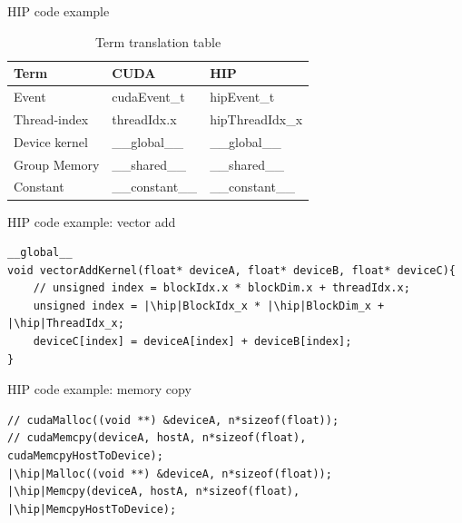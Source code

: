 \documentclass[aspectratio=169]{beamer}
\newcommand{\hip}{\textbf{\color{red}{hip}}}
\begin{document}
\begin{frame}{HIP code example}

\begin{table}[]
    \centering
    \begin{tabular}{l|l|l}
Term & CUDA & HIP\\\hline
Event & cudaEvent\_t & hipEvent\_t\\
Thread-index & threadIdx.x & hipThreadIdx\_x\\
Device kernel & \_\_global\_\_ & \_\_global\_\_\\
Group Memory &  \_\_shared\_\_ & \_\_shared\_\_\\
Constant & \_\_constant\_\_ & \_\_constant\_\_\\
\end{tabular}
    \caption{Term translation table}
    \label{tab:term_translate}
\end{table}

\end{frame}

\begin{frame}[fragile]{HIP code example: vector add}
\begin{verbatim}
__global__
void vectorAddKernel(float* deviceA, float* deviceB, float* deviceC){
    // unsigned index = blockIdx.x * blockDim.x + threadIdx.x;
    unsigned index = |\hip|BlockIdx_x * |\hip|BlockDim_x + |\hip|ThreadIdx_x;
    deviceC[index] = deviceA[index] + deviceB[index];
}
\end{verbatim}
\end{frame}

\begin{frame}[fragile]{HIP code example: memory copy}


\begin{verbatim}
// cudaMalloc((void **) &deviceA, n*sizeof(float));
// cudaMemcpy(deviceA, hostA, n*sizeof(float), cudaMemcpyHostToDevice);
|\hip|Malloc((void **) &deviceA, n*sizeof(float));
|\hip|Memcpy(deviceA, hostA, n*sizeof(float), |\hip|MemcpyHostToDevice);
\end{verbatim}
\end{frame}
\end{document}

